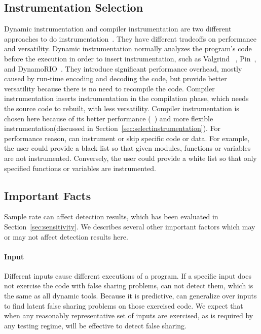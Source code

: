 \label{sec:discussion}

\subsection{Instrumentation Selection}
\label{sec:instrumentationtradeoff}
Dynamic instrumentation and compiler instrumentation are two different approaches to do instrumentation~\cite{Instrumentation}. They have different tradeoffs on performance and versatility. Dynamic instrumentation normally analyzes the program's code before the execution in order to insert instrumentation, such as Valgrind ~\cite{Valgrind}, Pin~\cite{Pin}, and DynamoRIO~\cite{DynamoRIO}. They introduce significant performance overhead, mostly caused by run-time encoding and decoding the code, but provide better versatility because there is no need to recompile the code. Compiler instrumentation inserts instrumentation in the compilation phase, which needs the source code to rebuilt, with less versatility. 
Compiler instrumentation is chosen here because of its better performance (~\cite{Instrumentation}) and more flexible instrumentation(discussed in Section~\ref{sec:selectinstrumentation}). For performance reason, \Predator{} can instrument or skip specific code or data. For example, the user could provide a black list so that given modules, functions or variables are not instrumented. Conversely, the user could provide a white list so that only specified functions or variables are instrumented.

\subsection{Important Facts}
Sample rate can affect detection results, which has been evaluated in Section~\ref{sec:sensitivity}. We describes several other important factors which may or may not affect detection results here. 

\paragraph{Input} Different inputs cause different executions of a program. If a specific input does not exercise the code with false sharing problems, \Predator{} can not detect them, which is the same as all dynamic tools. Because it is predictive, \Predator{} can generalize over inputs to find latent false sharing problems on those exercised code. We expect that when any reasonably representative set of inputs are exercised, as is required by any testing regime, \Predator{} will be effective to detect false sharing.

